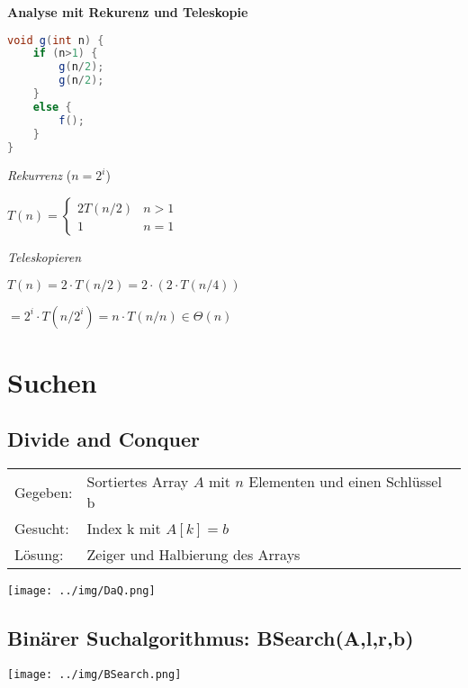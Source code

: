 \documentclass[german]{latex4ei/latex4ei_sheet}
\begin{document}
\begin{sectionbox}
\textbf{Analyse mit Rekurenz und Teleskopie}\par\vspace{-4px}
\begin{lstlisting}[language=Java]
void g(int n) {
    if (n>1) {
        g(n/2);
        g(n/2);
    }
    else {
        f();
    }
}
\end{lstlisting}\vspace{-4px}
\textit{Rekurrenz} ($n=2^{i}$)\par
$T(n)=\left\{\begin{array}{ll}2 T(n / 2) & n>1 \\ 1 & n=1\end{array}\right.$\par\smallskip
\textit{Teleskopieren}\par
$T(n)=2 \cdot T(n / 2) = 2 \cdot (2 \cdot T(n / 4)) $ \par
$= 2^{i} \cdot T(n/2^{i}) = n \cdot T(n/n) \in \Theta(n)$\par\smallskip

\end{sectionbox}

\section{Suchen}

\begin{sectionbox}
\subsection{Divide and Conquer}\smallskip
\begin{tabular*}{\columnwidth}{@{\extracolsep\fill}ll@{}}
Gegeben: & Sortiertes Array $A$ mit $n$ Elementen und einen Schlüssel b \\
Gesucht: & Index k mit $A[k]=b$ \\
Lösung: & Zeiger und Halbierung des Arrays\\
\end{tabular*}

\begin{center}
    \texttt{[image: ../img/DaQ.png]}
\end{center}\par\smallskip
\end{sectionbox}
\begin{sectionbox}
\subsection{Binärer Suchalgorithmus: BSearch(A,l,r,b)}\smallskip
\begin{center}
    \texttt{[image: ../img/BSearch.png]}
\end{center}\par\smallskip
\end{sectionbox}
\end{document}
